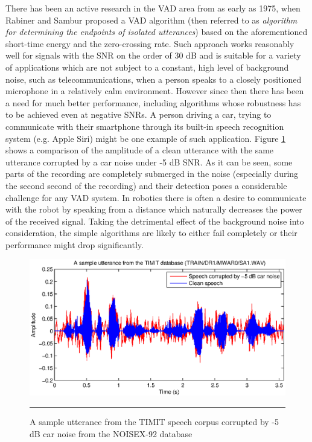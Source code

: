 There has been an active research in the VAD area from as early as 1975, when Rabiner and Sambur \cite{RabinerSambur} proposed a VAD algorithm (then referred to as \emph{algorithm for determining the endpoints of isolated utterances}) based on the aforementioned short-time energy and the zero-crossing rate. Such approach works reasonably well for signals with the SNR on the order of 30 dB and is suitable for a variety of applications which are not subject to a constant, high level of background noise, such as telecommunications, when a person speaks to a closely positioned microphone in a relatively calm environment. However since then there has been a need for much better performance, including algorithms whose robustness has to be achieved even at negative SNRs. A person driving a car, trying to communicate with their smartphone through its built-in speech recognition system (e.g. Apple Siri) might be one example of such application. Figure \ref{fig:corruptedSpeech} shows a comparison of the amplitude of a clean utterance with the same utterance corrupted by a car noise under -5 dB SNR. As it can be seen, some parts of the recording are completely submerged in the noise (especially during the second second of the recording) and their detection poses a considerable challenge for any VAD system. In robotics there is often a desire to communicate with the robot by speaking from a distance which naturally decreases the power of the received signal. Taking the detrimental effect of the background noise into consideration, the simple algorithms are likely to either fail completely or their performance might drop significantly.

\begin{figure}[htbp]
	\centering
		\includegraphics[width=0.9\columnwidth]{Figures/Chapter1/corruptedSpeech.eps}
		\rule{37em}{0.5pt}
	\caption[A sample utterance corrupted by -5 dB car noise]{A sample utterance from the TIMIT \cite{TIMIT} speech corpus corrupted by -5 dB car noise from the NOISEX-92 \cite{NOISEX} database}
	\label{fig:corruptedSpeech}
\end{figure}

